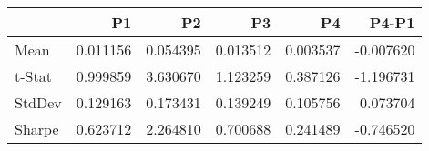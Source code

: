 \begin{tabular}{lrrrrr}
\toprule
 & P1 & P2 & P3 & P4 & P4-P1 \\
\midrule
Mean & 0.011156 & 0.054395 & 0.013512 & 0.003537 & -0.007620 \\
t-Stat & 0.999859 & 3.630670 & 1.123259 & 0.387126 & -1.196731 \\
StdDev & 0.129163 & 0.173431 & 0.139249 & 0.105756 & 0.073704 \\
Sharpe & 0.623712 & 2.264810 & 0.700688 & 0.241489 & -0.746520 \\
\bottomrule
\end{tabular}
